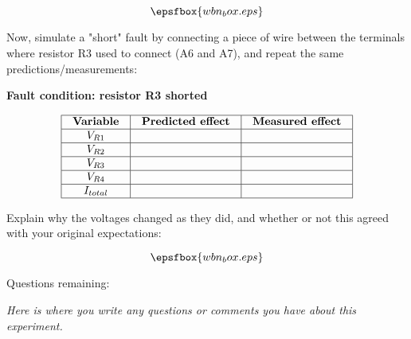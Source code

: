 $$\epsfbox{wbn_box.eps}$$

Now, simulate a "short" fault by connecting a piece of wire between the terminals where resistor R3 used to connect (A6 and A7), and repeat the same predictions/measurements:

\vskip 10pt

\goodbreak


\centerline{\bf Fault condition: resistor R3 shorted}


$$\vbox{\offinterlineskip
\halign{\strut
\vrule \quad\hfil # \ \hfil & 
\vrule \quad\hfil # \ \hfil & 
\vrule \quad\hfil # \ \hfil \vrule \cr 
\noalign{\hrule}
%
{\bf Variable} & {\bf Predicted effect} & {\bf Measured effect} \cr
\noalign{\hrule}
%
$V_{R1}$   &   &   \cr
\noalign{\hrule}
%
$V_{R2}$   &   &   \cr
\noalign{\hrule}
%
$V_{R3}$   &   &   \cr
\noalign{\hrule}
%
$V_{R4}$   &   &   \cr
\noalign{\hrule}
%
$I_{total}$   &   &   \cr
\noalign{\hrule}
} %
}$$ %

Explain why the voltages changed as they did, and whether or not this agreed with your original expectations:

$$\epsfbox{wbn_box.eps}$$

\vskip 10pt

\goodbreak

\noindent Questions remaining:

{\it Here is where you write any questions or comments you have about this experiment.}

\vskip 50pt


















